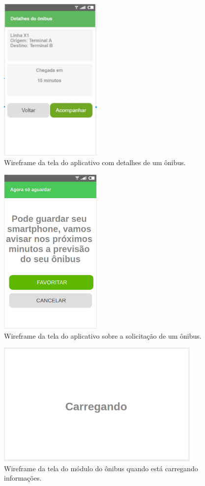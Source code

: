 \documentclass[
	12pt,				%
	oneside,			%
	a4paper,			%
	brazil				%
]{abntex2}
\begin{document}
\begin{apendicesenv}
\begin{figure}[!h]
\centering
\includegraphics[width=5cm, center]{images/tela-4-informacoes-do-onibus.PNG}
\caption{Wireframe da tela do aplicativo com detalhes de um ônibus.}
\label{Rotulo}
\end{figure}

\begin{figure}[!h]
\centering
\includegraphics[width=5cm, center]{images/tela-5-acompanhamento-do-onibus.PNG}
\caption{Wireframe da tela do aplicativo sobre a solicitação de um ônibus.}
\label{Rotulo}
\end{figure}

\begin{figure}[!h]
\centering
\includegraphics[width=10cm, center]{images/busmodule-carregando}
\caption{Wireframe da tela do módulo do ônibus quando está carregando informações.}
\label{Rotulo}
\end{figure}


\end{apendicesenv}
\end{document}
